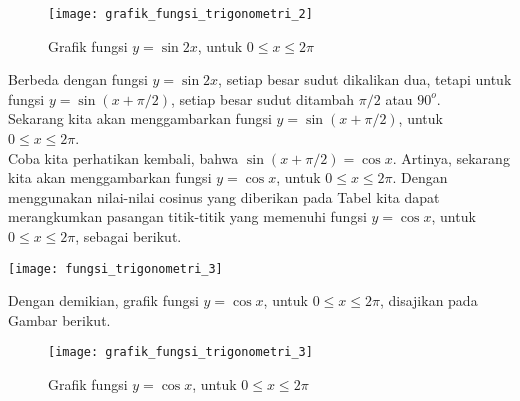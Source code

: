 \documentclass[11pt,fleqn]{book} %
\begin{document}
\begin{myEnumerate}
\begin{itemize}
\begin{enumerate}
\begin{example}
\begin{figure}[!ht]
\begin{center}
\texttt{[image: grafik\_fungsi\_trigonometri\_2]} 
\caption{Grafik fungsi $y = \sin 2x$, untuk $0 \leq x\leq 2\pi$}
\end{center}
\end{figure}

Berbeda dengan fungsi $y = \sin 2x$, setiap besar sudut dikalikan dua, tetapi untuk fungsi $y = \sin(x+\pi/2)$, setiap besar sudut ditambah $\pi/2$ atau $90^o$.\\
Sekarang kita akan menggambarkan fungsi $y = \sin(x+\pi/2)$, untuk $0 \leq x\leq 2\pi$.\\
Coba kita perhatikan kembali, bahwa $\sin(x+\pi/2) = \cos x$. Artinya, sekarang kita akan menggambarkan fungsi $y = \cos x$, untuk $0 \leq x\leq 2\pi$. Dengan menggunakan nilai-nilai cosinus yang diberikan pada Tabel kita dapat merangkumkan pasangan titik-titik  yang memenuhi fungsi $y = \cos x$, untuk $0 \leq x\leq 2\pi$, sebagai berikut.

\texttt{[image: fungsi\_trigonometri\_3]}

Dengan demikian, grafik fungsi $y = \cos x$, untuk $0 \leq x\leq 2\pi$, disajikan pada Gambar berikut.\\

\begin{figure}[!ht]
\begin{center}
\texttt{[image: grafik\_fungsi\_trigonometri\_3]} 
\caption{Grafik fungsi $y = \cos x$, untuk $0 \leq x\leq 2\pi$}
\end{center}
\end{figure}


\end{example}
\end{enumerate}
\end{itemize}
\end{myEnumerate}
\end{document}
